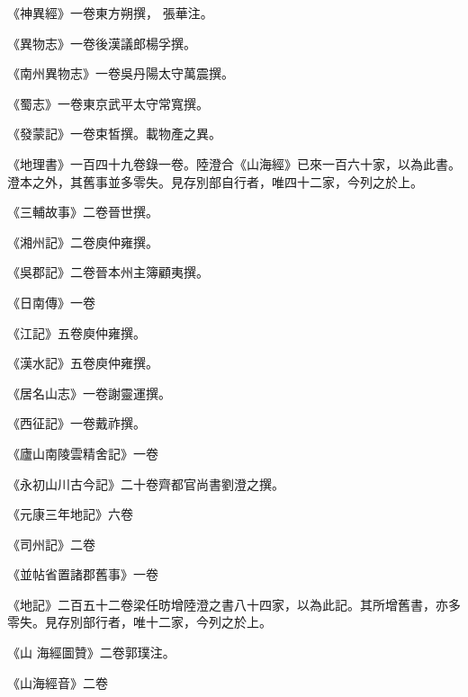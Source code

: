 \begin{pinyinscope}
 《神異經》一卷東方朔撰，
 張華注。



 《異物志》一卷後漢議郎楊孚撰。



 《南州異物志》一卷吳丹陽太守萬震撰。



 《蜀志》一卷東京武平太守常寬撰。



 《發蒙記》一卷束皙撰。載物產之異。



 《地理書》一百四十九卷錄一卷。陸澄合《山海經》已來一百六十家，以為此書。澄本之外，其舊事並多零失。見存別部自行者，唯四十二家，今列之於上。



 《三輔故事》二卷晉世撰。



 《湘州記》二卷庾仲雍撰。



 《吳郡記》二卷晉本州主簿顧夷撰。



 《日南傳》一卷



 《江記》五卷庾仲雍撰。



 《漢水記》五卷庾仲雍撰。



 《居名山志》一卷謝靈運撰。



 《西征記》一卷戴祚撰。



 《廬山南陵雲精舍記》一卷



 《永初山川古今記》二十卷齊都官尚書劉澄之撰。



 《元康三年地記》六卷



 《司州記》二卷



 《並帖省置諸郡舊事》一卷



 《地記》二百五十二卷梁任昉增陸澄之書八十四家，以為此記。其所增舊書，亦多零失。見存別部行者，唯十二家，今列之於上。



 《山
 海經圖贊》二卷郭璞注。



 《山海經音》二卷




\end{pinyinscope}
